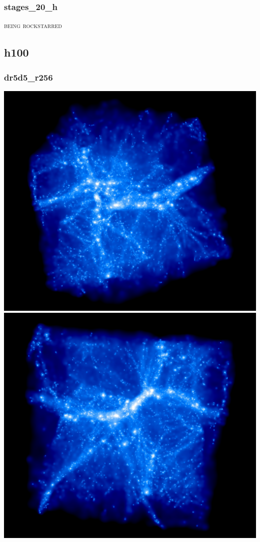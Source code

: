 % 
%
%
%
%
%
%
%

\newpage

\subsubsection{stages\_20\_h}
 
\textsc{being rockstarred}  

\subsection{h100}

\subsubsection{dr5d5\_r256}
\includegraphics[scale=0.12]{r256/h100/dr5d5_r256/rotate_00188.jpg} 
\includegraphics[scale=0.12]{r256/h100/dr5d5_r256/rotate_00320.jpg} \\
